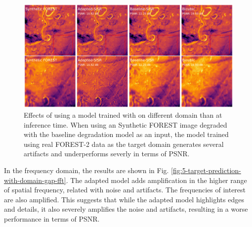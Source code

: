         \begin{figure}[H]
            \centering
            \includegraphics[scale=0.28]{Includes/5-target-prediction-with-domain-gap.pdf}
            \caption{Effects of using a model trained with on different domain than at inference time. 
                     When using an Synthetic FOREST image degraded with the baseline degradation model as an input, the model trained using real FOREST-2 data as the target domain generates several artifacts and underperforms severly in terms of PSNR. }
            \label{fig:5-target-prediction-with-domain-gap}
        \end{figure}

        In the frequency domain, the results  are shown in Fig. \ref{fig:5-target-prediction-with-domain-gap-fft}.  
        The adapted model adds amplification in the higher range of spatial frequency, related with noise and artifacts.
        The frequencies of interest are also amplified.
        This suggests that while the adapted model highlights edges and details, it also severely amplifies the noise and artifacts, resulting in a worse performance in terms of PSNR.

